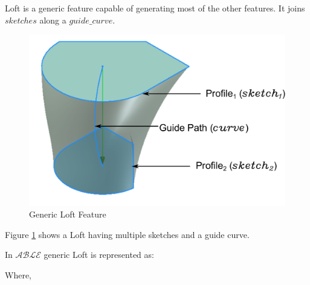 
Loft is a generic feature capable of generating most of the other features. It joins $sketches$ along a $guide\_curve$.  

\begin{figure}[htbp]
\centering
	\includegraphics[scale=0.5]{../Common/images//LoftPreview.pdf} 
\caption{Generic Loft Feature}
\label{fig:abstraction:loftschematics}
\end{figure}



Figure \ref{fig:abstraction:loftschematics} shows a Loft having multiple sketches and a guide curve. 






In $\mathcal{ABLE}$ generic Loft is represented as:
\vskip 2mm
\vskip 2mm

Where,

